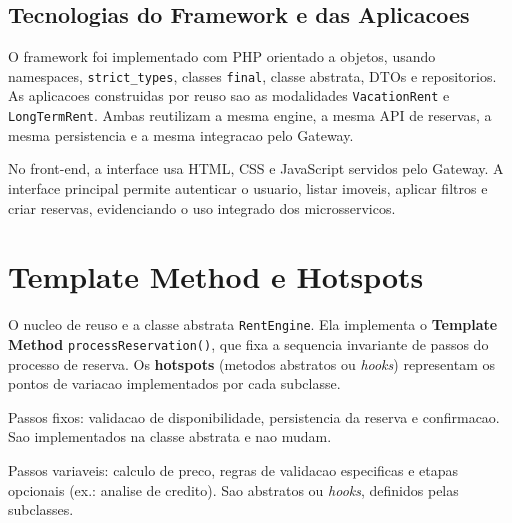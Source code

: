\documentclass[12pt,a4paper]{article}
\begin{document}
\subsection{Tecnologias do Framework e das Aplicacoes}
O framework foi implementado com PHP orientado a objetos, usando namespaces,
\texttt{strict\_types}, classes \texttt{final}, classe abstrata, DTOs e repositorios.
As aplicacoes construidas por reuso sao as modalidades \texttt{VacationRent} e
\texttt{LongTermRent}. Ambas reutilizam a mesma engine, a mesma API de reservas, a
mesma persistencia e a mesma integracao pelo Gateway.

No front-end, a interface usa HTML, CSS e JavaScript servidos pelo Gateway. A interface
principal permite autenticar o usuario, listar imoveis, aplicar filtros e criar
reservas, evidenciando o uso integrado dos microsservicos.

\section{Template Method e Hotspots}
O nucleo de reuso e a classe abstrata \texttt{RentEngine}. Ela implementa o
\textbf{Template Method} \texttt{processReservation()}, que fixa a sequencia
invariante de passos do processo de reserva. Os \textbf{hotspots} (metodos abstratos
ou \textit{hooks}) representam os pontos de variacao implementados por cada subclasse.

\begin{description}[leftmargin=1.5cm]
    \item[Frozen Spots] Passos fixos: validacao de disponibilidade, persistencia da
    reserva e confirmacao. Sao implementados na classe abstrata e nao mudam.
    \item[Hot Spots] Passos variaveis: calculo de preco, regras de validacao
    especificas e etapas opcionais (ex.: analise de credito). Sao abstratos ou
    \textit{hooks}, definidos pelas subclasses.
\end{description}
\end{document}

